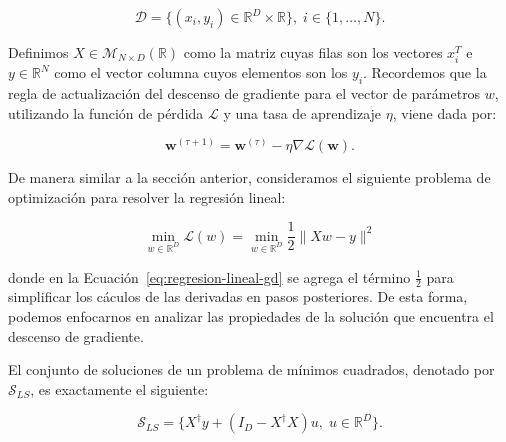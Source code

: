 \[
    \mathcal{D} = \{ (x_i, y_i) \in \mathbb{R}^{D} \times \mathbb{R} \}, \; i \in \{ 1, \ldots, N \}.
\]\newline

Definimos $X \in \mathcal{M}_{N \times D}(\mathbb{R})$ como la matriz cuyas filas son los vectores $x_{i}^{T}$ e $y \in \mathbb{R}^{N}$ como el vector columna cuyos elementos son los $y_i$. Recordemos que la regla de actualización del descenso de gradiente para el vector de parámetros $w$, utilizando la función de pérdida $\mathcal{L}$ y una tasa de aprendizaje $\eta$, viene dada por:

\begin{equation}
    \mathbf{w}^{(\tau + 1)} = \mathbf{w}^{(\tau)} - \eta \nabla \mathcal{L}(\mathbf{w}).
    \label{eq:descenso-gradiente2}
\end{equation}\newline

De manera similar a la sección anterior, consideramos el siguiente problema de optimización para resolver la regresión lineal:

\begin{equation}\label{eq:regresion-lineal-gd}
    \min_{w \in \mathbb{R}^{D}} \mathcal{L}(w) = \min_{w \in \mathbb{R}^{D}} \frac{1}{2}\| Xw - y \|^{2}
\end{equation}

donde en la Ecuación~\eqref{eq:regresion-lineal-gd} se agrega el término $\frac{1}{2}$ para simplificar los cáculos de las derivadas en pasos posteriores. De esta forma, podemos enfocarnos en analizar las propiedades de la solución que encuentra el descenso de gradiente.\newline

\begin{teorema}
    El conjunto de soluciones de un problema de mínimos cuadrados, denotado por $\mathcal{S}_{LS}$, es exactamente el siguiente:

    \[
        \mathcal{S}_{LS} = \{ X^{\dagger}y + (I_D -X^{\dagger}X)u, \; u \in \mathbb{R}^{D} \}.
    \]
\end{teorema}

